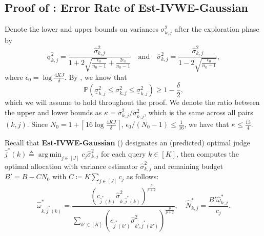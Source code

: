 \documentclass{article}
\def\sP{{\mathbb{P}}}
\DeclareMathOperator*{\argmin}{arg\,min}
\theoremstyle{plain}
\theoremstyle{definition}
\theoremstyle{plain}
\begin{document}
\subsection{\texorpdfstring{Proof of : Error Rate of Est-IVWE-Gaussian}{Proof of Theorem F.4: Error Rate of Est-IVWE-Gaussian}}
\label{app:gaussian-unknown}
Denote the lower and upper bounds on variances $\sigma_{k,j}^2$ after the exploration phase by
\begin{equation}
    \underline{\sigma}_{k,j}^2 = \frac{\hat{\sigma}_{k,j}^2}{1+2\sqrt{\frac{\epsilon_0}{n_0-1}} +\frac{2\epsilon_0}{n_0-1}}
    \quad \text{and} \quad
    \overline{\sigma}_{k,j}^2 = \frac{\hat{\sigma}_{k,j}^2}{1 - 2\sqrt{\frac{\epsilon_0}{n_0-1}}},
\end{equation}
where $\epsilon_0 = \log\frac{4 K J}{\delta}$.
By , we know that
\begin{equation}
    \sP\left( \underline{\sigma}_{k,j}^2 \leq \sigma_{k,j}^2 \leq \underline{\sigma}_{k,j}^2 \right) \geq 1 - \frac{\delta}{2},
\end{equation}
which we will assume to hold throughout the proof.
We denote the ratio between the upper and lower bounds as $\kappa = \overline{\sigma}_{k,j}^2 / \underline{\sigma}_{k,j}^2$, which is the same across all pairs $(k, j)$.
Since $N_0 = 1 + \left\lceil 16 \log \frac{4KJ}{\delta} \right\rceil$, $\epsilon_0 / (N_0-1) \leq \frac{1}{16}$, we have that $\kappa \leq \frac{13}{4}$.

Recall that \textbf{Est-IVWE-Gaussian} () designates an (predicted) optimal judge $\hat{j}^*(k) \triangleq \argmin_{j \in [J]} c_j \hat{\sigma}_{k,j}^2$ for each query $k \in [K]$, then computes the optimal allocation with variance estimator $\hat{\sigma}_{k,j}^2$ and remaining budget $B' = B - C N_0$ with $C \coloneq K \sum_{j\in[J]} c_j$ as follows:
\begin{equation}
    \widehat{\omega}_{k,\hat{j}^*(k)}^* = \frac{\left(c_{\hat{j}^*(k)} \hat{\sigma}_{k, \hat{j}^*(k)}^2 \right)^{\frac{p}{p+2}}}{\sum_{k'\in[K]} \left( c_{\hat{j}^*(k')} \hat{\sigma}_{k', \hat{j}^*(k')}^2 \right)^{\frac{p}{p+2}}}, \quad
    \widehat{N}_{k,j}^* = \frac{B' \widehat{\omega}_{k,j}^*}{c_j}.
\end{equation}
\end{document}
